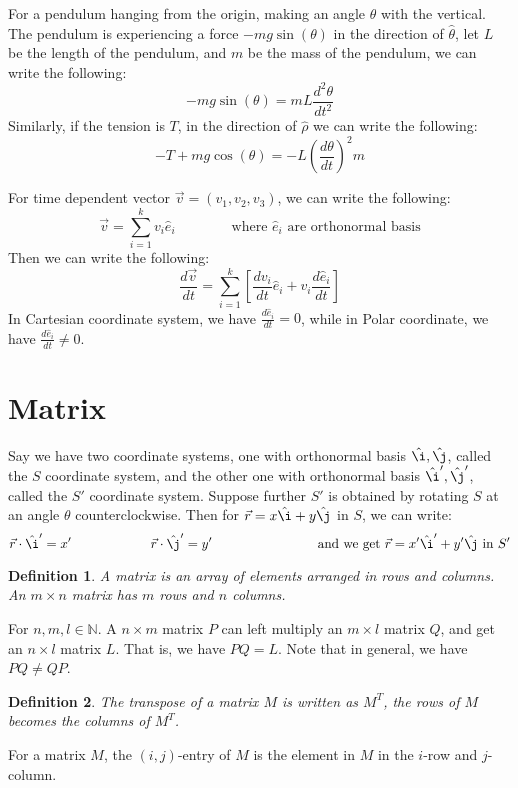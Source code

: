 \documentclass[11pt]{article}
\theoremstyle{break}
\theoremstyle{break}
\newtheorem{defn}{Definition}[corL]
\newcommand{\N}{\mathbb{N}}
\newcommand{\ihat}{\hat{\i}}
\newcommand{\jhat}{\hat{\j}}
\begin{document}
For a pendulum hanging from the origin, making an angle $\theta$ with the vertical. The pendulum is experiencing a force $-mg\sin(\theta)$ in the direction of $\hat\theta$, let $L$ be the length of the pendulum, and $m$ be the mass of the pendulum, we can write the following:
$$-mg\sin(\theta) = m L \frac{d^2\theta}{dt^2}$$ 
Similarly, if the tension is $T$, in the direction of $\hat\rho$ we can write the following:
$$-T+mg\cos(\theta) = -L \left(\frac{d\theta}{dt}\right)^2m$$
\newpage

For time dependent vector $\vec{v}=(v_1,v_2,v_3)$, we can write the following:
$$\vec{v} = \sum_{i=1}^k v_i\hat{e}_i \qquad\qquad\text{where }\hat{e}_i\text{ are orthonormal basis}$$
Then we can write the following:
$$\frac{d\vec{v}}{dt} = \sum_{i=1}^k \left[\frac{dv_i}{dt}\hat{e}_i + v_i\frac{d\hat{e}_i}{dt}\right]$$
In Cartesian coordinate system, we have $\frac{d\hat{e}_i}{dt} = 0$, while in Polar coordinate, we have $\frac{d\hat{e}_i}{dt}\neq 0$. 

\newpage
\section{\color{red} Matrix}
Say we have two coordinate systems, one with orthonormal basis $\ihat,\jhat$, called the $S$ coordinate system, and the other one with orthonormal basis $\ihat',\jhat'$, called the $S'$ coordinate system. Suppose further $S'$ is obtained by rotating $S$ at an angle $\theta$ counterclockwise. Then for $\vec{r}=x\ihat + y \jhat$ in $S$, we can write:
$$\vec{r}\cdot \ihat' = x' \qquad\qquad\qquad \vec{r}\cdot \jhat' = y' \qquad\qquad\qquad\qquad\text{and we get }\vec{r} = x'\ihat' + y'\jhat\text{ in }S'$$

\begin{defn}
A matrix is an array of elements arranged in rows and columns.\\ An $m\times n$ matrix has $m$ rows and $n$ columns.
\end{defn}

For $n,m,l \in \N$. A $n\times m$ matrix $P$ can left multiply an $m\times l$ matrix $Q$, and get an $n\times l$ matrix $L$. That is, we have $PQ = L$. Note that in general, we have $PQ \neq QP$. 

\begin{defn}
The transpose of a matrix $M$ is written as $M^T$, the rows of $M$ becomes the columns of $M^T$.
\end{defn}

For a matrix $M$, the $(i,j)$-entry of $M$ is the element in $M$ in the $i$-row and $j$-column.\\
\end{document}
